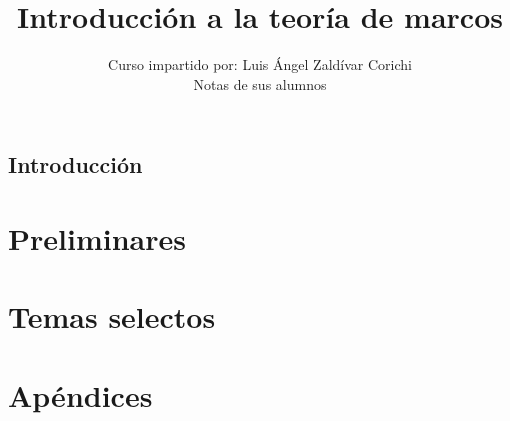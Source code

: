 \documentclass[12pt,letterpaper,titlepage,draft]{book}
\title{Introducción a la teoría de marcos}
\author{Curso impartido por: Luis Ángel Zaldívar Corichi \\
\small{Notas de sus alumnos}}
\theoremstyle{definition}
\newcommand\<{\langle}
\renewcommand\>{\rangle}
\begin{document}
\maketitle

\chapter*{Introducción}


\tableofcontents

\part{Preliminares}








\part{Temas selectos}








\part{Apéndices}



\end{document}
